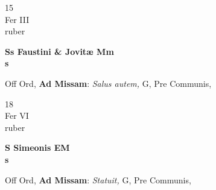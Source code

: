 \documentclass[10pt, openany]{book}
\begin{document}
        \begin{center}
            \begin{minipage}{3.5in}
                \vspace{2em}
                \begin{minipage}{0.5in}
                    {\Huge 15} \\
                    {\normalsize Fer III} \\
                    {\normalsize ruber}
                \end{minipage}
                \begin{minipage}{3.0in}
                    \textbf{ \large Ss Faustini \& Jovitæ Mm \\
                    \textnormal{\normalsize s}} \\ 
                \end{minipage}
                \begin{justify}Off Ord, \textbf{Ad Missam}: \textit{Salus autem,} G, Pre Communis,  
                \end{justify}
            \end{minipage}
        \end{center}
    
        \begin{center}
            \begin{minipage}{3.5in}
                \vspace{2em}
                \begin{minipage}{0.5in}
                    {\Huge 18} \\
                    {\normalsize Fer VI} \\
                    {\normalsize ruber}
                \end{minipage}
                \begin{minipage}{3.0in}
                    \textbf{ \large S Simeonis EM \\
                    \textnormal{\normalsize s}} \\ 
                \end{minipage}
                \begin{justify}Off Ord, \textbf{Ad Missam}: \textit{Statuit,} G, Pre Communis,  
                \end{justify}
            \end{minipage}
        \end{center}
    
\end{document}
